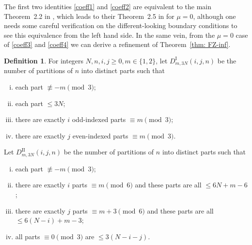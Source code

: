 \documentclass[12pt]{amsart}
\numberwithin{equation}{section}
\theoremstyle{plain}
\theoremstyle{definition}
\newtheorem{Def}[theorem]{Definition}
\begin{document}
The first two identities \eqref{coeff1} and \eqref{coeff2} 
 are equivalent to the main Theorem~2.2 in \cite{bu1}, which leads to their Theorem~2.5 in \cite{bu1}
 for $\mu=0$,
although one needs some careful verification on the different-looking boundary conditions to see this equivalence from the left hand side.  In the same vein, from  the $\mu=0$ case of 
\eqref{coeff3} and \eqref{coeff4}  
 we can
derive a refinement 
of Theorem~\ref{thm: FZ-inf}.

\begin{Def}
For integers $N,n,i,j\geq 0, m\in\{1,2\}$, let $D_{m,3N}^{\text{I}}(i,j,n)$ be the number of partitions of $n$ into distinct parts such that
\begin{enumerate}[i.]
\item each part $\not\equiv -m \pmod 3$;
\item each part $\leq 3N$;
\item there are exactly $i$ odd-indexed parts $\equiv m \pmod 3$;
\item there are exactly $j$ even-indexed parts $\equiv m \pmod 3$.
\end{enumerate}
Let $D_{m,3N}^{\text{II}}(i,j,n)$ be the number of partitions of $n$ into distinct parts such that
\begin{enumerate}[i.]
\item each part $\not\equiv -m \pmod 3$;
\item there are exactly $i$ parts $\equiv m \pmod 6$ and these parts are all $\leq 6N+m-6$;
\item there are exactly $j$ parts $\equiv m+3 \pmod 6$ and these parts are all $\leq 6(N-i)+m-3$;
\item all parts $\equiv 0 \pmod 3$ are $\leq 3(N-i-j)$.
\end{enumerate}
\end{Def}
\end{document}
